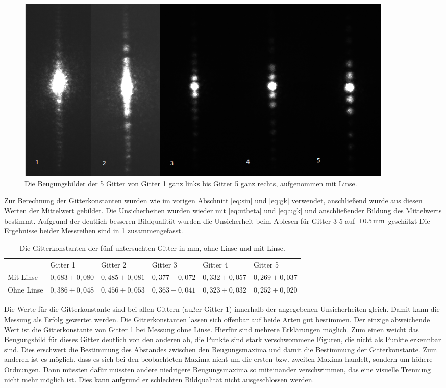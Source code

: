 \begin{figure}[h]
	\centering
	\includegraphics[width=0.9\textwidth]{gitter_fourier.png}
	\caption{Die Beugungsbilder der 5 Gitter von Gitter 1 ganz links bis Gitter 5 ganz rechts, aufgenommen mit Linse.}
	\label{gitterfourier}
\end{figure}

Zur Berechnung der Gitterkonstanten wurden wie im vorigen Abschnitt \cref{eq:sin} und \cref{eq:gk} verwendet, anschließend wurde aus diesen Werten der Mittelwert gebildet. Die Unsicherheiten wurden wieder mit \cref{eq:utheta} und \cref{eq:ugk} und anschließender Bildung des Mittelwerts bestimmt. Aufgrund der deutlich besseren Bildqualität wurden die Unsicherheit beim Ablesen für Gitter 3-5 auf $\SI{\pm0,5}{mm}$ geschätzt Die Ergebnisse beider Messreihen sind in \cref{tab2} zusammengefasst.

\begin{table}[h]
	\caption{Die Gitterkonstanten der fünf untersuchten Gitter in mm, ohne Linse und mit Linse.}
	\begin{tabular}{llllll}
		&Gitter 1 & Gitter 2& Gitter 3& Gitter 4& Gitter 5\\
		Mit Linse&$0,683\pm0,080$ & $0,485\pm0,081$ & $0,377\pm0,072$ & $0,332\pm0,057$ & $0,269\pm0,037$\\
		Ohne Linse&$0,386\pm0,048$ & $0,456\pm0,053$ & $0,363\pm0,041$ & $0,323\pm0,032$ & $0,252\pm0,020$
	\end{tabular}
	\label{tab2}
\end{table}

Die Werte für die Gitterkonstante sind bei allen Gittern (außer Gitter 1) innerhalb der angegebenen Unsicherheiten gleich. Damit kann die Messung als Erfolg gewertet werden. Die Gitterkonstanten lassen sich offenbar auf beide Arten gut bestimmen. Der einzige abweichende Wert ist die Gitterkonstante von Gitter 1 bei Messung ohne Linse. Hierfür sind mehrere Erklärungen möglich. Zum einen weicht das Beugungsbild für dieses Gitter deutlich von den anderen ab, die Punkte sind stark verschwommene Figuren, die nicht als Punkte erkennbar sind. Dies erschwert die Bestimmung des Abstandes zwischen den Beugungsmaxima und damit die Bestimmung der Gitterkonstante. Zum anderen ist es möglich, dass es sich bei den beobachteten Maxima nicht um die ersten bzw. zweiten Maxima handelt, sondern um höhere Ordnungen. Dann müssten dafür müssten andere niedrigere Beugungsmaxima so miteinander verschwimmen, das eine visuelle Trennung nicht mehr möglich ist. Dies kann aufgrund er schlechten Bildqualität nicht ausgeschlossen werden.

